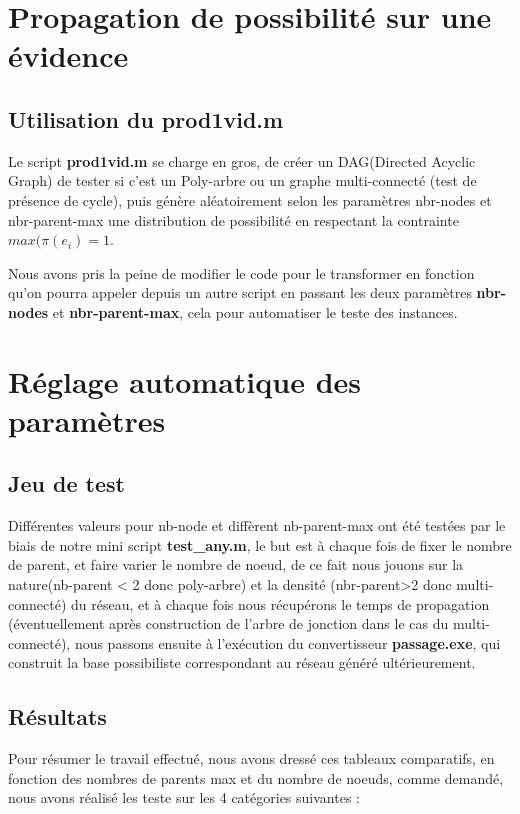 \documentclass[]{report}
\begin{document}
	\section{Propagation de possibilité sur une évidence}
	\subsection{Utilisation du prod1vid.m}
	Le script \textbf{prod1vid.m} se charge en gros, de créer un DAG(Directed Acyclic Graph) de tester si c'est un Poly-arbre ou un graphe multi-connecté (test de présence de cycle), puis génère aléatoirement selon les paramètres nbr-nodes et nbr-parent-max une distribution de possibilité en respectant la contrainte $max(\pi(e_i)=1$.
	\par Nous avons  pris la peine de modifier le code pour le transformer en fonction qu'on pourra appeler depuis un autre script en passant les deux paramètres \textbf{nbr-nodes} et \textbf{nbr-parent-max}, cela pour automatiser le teste des instances.
	
	\section{Réglage automatique des paramètres}
	\subsection{Jeu de test}
	Différentes valeurs pour nb-node et diffèrent nb-parent-max ont été testées par le biais de notre mini script \textbf{test\_any.m}, le but est à chaque fois de fixer le nombre de parent, et faire varier le nombre de noeud, de ce fait nous jouons sur la nature(nb-parent < 2 donc poly-arbre) et la densité (nbr-parent>2 donc multi-connecté) du réseau, et à chaque fois nous récupérons le temps de propagation (éventuellement après construction de l'arbre de jonction dans le cas du multi-connecté), nous passons ensuite à l'exécution du convertisseur \textbf{passage.exe}, qui construit la base possibiliste correspondant au réseau généré ultérieurement.
	\subsection{Résultats}
	Pour résumer le travail effectué, nous avons dressé ces tableaux comparatifs, en fonction des nombres de parents max et du nombre de noeuds, comme demandé, nous avons réalisé les teste sur les 4 catégories suivantes : 
\end{document}
